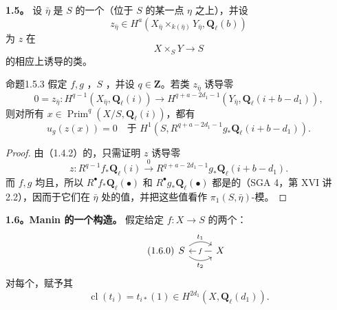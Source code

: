 \textbf{1.5。} 设 $\bar\eta$ 是 $S$ 的一个（位于 $S$ 的某一点 $\eta$ 之上），并设
\begin{equation}\tag{1.5.1}
z_{\bar\eta}\in H^a(X_{\bar\eta}\times_{k(\bar\eta)}Y_{\bar\eta},\mathbf Q_\ell(b))
\end{equation}
为 $z$ 在
\begin{equation}\tag{1.5.2}
X\times_S Y\longrightarrow S
\end{equation}
的相应上诱导的类。
\begin{SGAresult}{命题}{1.5.3}
假定 $f,g$ ，$S$ ，并设 $q\in\mathbf Z$。若类 $z_{\bar\eta}$ 诱导零
\begin{equation}\tag{1.5.3}
0=z_{\bar\eta}:H^{q-1}(X_{\bar\eta},\mathbf Q_\ell(i))\longrightarrow H^{q+a-2d_1-1}(Y_{\bar\eta},\mathbf Q_\ell(i+b-d_1)),
\end{equation}
则对所有 $x\in\operatorname{Prim}^q(X/S,\mathbf Q_\ell(i))$，都有
\begin{equation}\tag{1.5.4}
u_g(z(x))=0\quad\text{于 }H^1(S,R^{q+a-2d_1-1}g_*\mathbf Q_\ell(i+b-d_1)).
\end{equation}
\end{SGAresult}
\begin{proof}
由（1.4.2）的，只需证明 $z$ 诱导零
\begin{equation}\tag{1.5.5}
z:R^{q-1}f_*\mathbf Q_\ell(i)\xrightarrow{\ 0\ }R^{q+a-2d_1-1}g_*\mathbf Q_\ell(i+b-d_1).
\end{equation}
而 $f,g$ 均且，所以 $R^\bullet f_*\mathbf Q_\ell(\bullet)$ 和 $R^\bullet g_*\mathbf Q_\ell(\bullet)$ 都是的（SGA 4，第 XVI 讲 2.2），因而于它们在 $\bar\eta$ 处的值，并把这些值看作 $\pi_1(S,\bar\eta)$-模。
\end{proof}
\textbf{1.6。Manin 的一个构造。}
假定给定 $f:X\to S$ 的两个：
\begin{equation}\tag{1.6.0}
\begin{tikzcd}
S \arrow[r,bend left=35,"t_1"] \arrow[r,bend right=35,"t_2"'] & X \arrow[l,"f" description]
\end{tikzcd}
\end{equation}
对每个，赋予其
\begin{equation}\tag{1.6.1}
\operatorname{cl}(t_i)=t_{i*}(1)\in H^{2d_1}(X,\mathbf Q_\ell(d_1)).
\end{equation}
